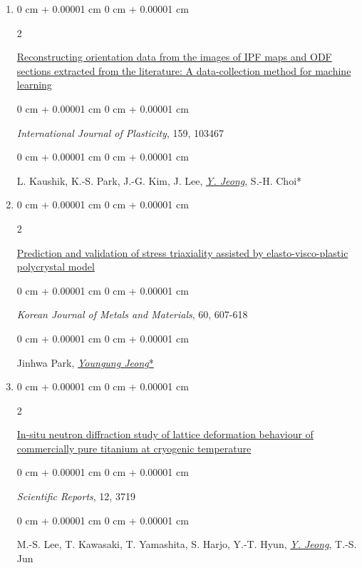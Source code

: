\documentclass[10pt, letterpaper]{article}
\newenvironment{onecolentry}{
    \begin{adjustwidth}{
        0 cm + 0.00001 cm
    }{
        0 cm + 0.00001 cm
    }
}{
    \end{adjustwidth}
} %
\newenvironment{twocolentry}[2][]{
    \onecolentry
    \def\secondColumn{#2}
    \setcolumnwidth{\fill, 4.5 cm}
    \begin{paracol}{2}
}{
    \switchcolumn \raggedleft \secondColumn
    \end{paracol}
    \endonecolentry
} %
\begin{document}
\begin{enumerate}
        \item
        \begin{twocolentry}{2023}
            \href{https://doi.org/10.1016/j.ijplas.2022.103467}{Reconstructing orientation data from the images of IPF maps and ODF sections extracted from the literature: A data-collection method for machine learning}
        \end{twocolentry}
        \begin{onecolentry}
            {\it International Journal of Plasticity}, 159, 103467
        \end{onecolentry}
        \begin{onecolentry}
            L. Kaushik, K.-S. Park, J.-G. Kim, J. Lee, {\underline{\textit{Y. Jeong}}}, S.-H. Choi*
        \end{onecolentry}
        \vspace{0.10 cm}


        \item
        \begin{twocolentry}{2022}
            \href{http://dx.doi.org/10.3365/KJMM.2022.60.8.607}{Prediction and validation of stress triaxiality assisted by elasto-visco-plastic polycrystal model}
        \end{twocolentry}
        \begin{onecolentry}
            {\it Korean Journal of Metals and Materials}, 60, 607-618
        \end{onecolentry}
        \begin{onecolentry}
            Jinhwa Park, {\underline{\textit{Youngung Jeong}*}}
        \end{onecolentry}
        \vspace{0.10 cm}

        \item
        \begin{twocolentry}{2022}
            \href{https://doi.org/10.1038/s41598-022-07640-3}{In-situ neutron diffraction study of lattice deformation behaviour of commercially pure titanium at cryogenic temperature}
        \end{twocolentry}
        \begin{onecolentry}
            {\it Scientific Reports}, 12, 3719
        \end{onecolentry}
        \begin{onecolentry}
            M.-S. Lee, T. Kawasaki, T. Yamashita, S. Harjo, Y.-T. Hyun, {\underline{\textit{Y. Jeong}}}, T.-S. Jun
        \end{onecolentry}
        \vspace{0.10 cm}


\end{enumerate}
\end{document}
